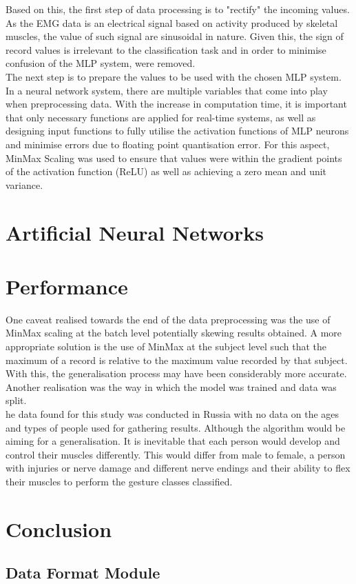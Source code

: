 \documentclass[11pt]{article}
\begin{document}
	\noindent
	Based on this, the first step of data processing is to "rectify" the incoming values. As the EMG data is an electrical signal based on activity produced by skeletal muscles, the value of such signal are sinusoidal in nature. Given this, the sign of record values is irrelevant to the classification task and in order to minimise confusion of the MLP system, were removed.\\
	
	\noindent
	The next step is to prepare the values to be used with the chosen MLP system. In a neural network system, there are multiple variables that come into play when preprocessing data. With the increase in computation time, it is important that only necessary functions are applied for real-time systems, as well as designing input functions to fully utilise the activation functions of MLP neurons and minimise errors due to floating point quantisation error. For this aspect, MinMax Scaling was used to ensure that values were within the gradient points of the activation function (ReLU) as well as achieving a zero mean and unit variance.
	
	\section{Artificial Neural Networks}
	
	
	\section{Performance}
	
	One caveat realised towards the end of the data preprocessing was the use of MinMax scaling at the batch level potentially skewing results obtained. A more appropriate solution is the use of MinMax at the subject level such that the maximum of a record is relative to the maximum value recorded by that subject. With this, the generalisation process may have been considerably more accurate.\\
	
	\noindent
	Another realisation was the way in which the model was trained and data was split. \\
	
	\noindent
	he data found for this study was conducted in Russia with no data on the ages and types of people used for gathering results. Although the algorithm would be aiming for a generalisation. It is inevitable that each person would develop and control their muscles differently. This would differ from male to female, a person with injuries or nerve damage and different nerve endings and their ability to flex their muscles to perform the gesture classes classified.
		
	
	\section{Conclusion}
	
	\newpage
	\nocite{*}	
	
	{}
	
	\newpage
	\begin{appendices}
		\section{Data Format Module}\label{adx:data_format}
		
	\end{appendices}	
\end{document}
